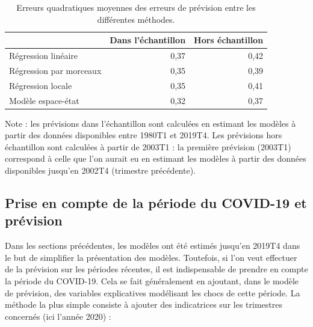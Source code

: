 \documentclass[
  a4paper,
  DIV=11,
  numbers=noendperiod,
  french]{scrartcl}
\newcommand\1{{\mathds 1}}
\theoremstyle{remark}
\begin{document}
\begin{longtable}[]{@{}lrr@{}}

\caption{\label{tbl-res-model-pib}Erreurs quadratiques moyennes des
erreurs de prévision entre les différentes méthodes.}

\tabularnewline

\toprule\noalign{}
& Dans l'échantillon & Hors échantillon \\
\midrule\noalign{}
\endhead
\bottomrule\noalign{}
\endlastfoot
Régression linéaire & 0,37 & 0,42 \\
Régression par morceaux & 0,35 & 0,39 \\
Régression locale & 0,35 & 0,41 \\
Modèle espace-état & 0,32 & 0,37 \\

\end{longtable}

Note : les prévisions dans l'échantillon sont calculées en estimant les
modèles à partir des données disponibles entre 1980T1 et 2019T4. Les
prévisions hors échantillon sont calculées à partir de 2003T1 : la
première prévision (2003T1) correspond à celle que l'on aurait eu en
estimant les modèles à partir des données disponibles jusqu'en 2002T4
(trimestre précédente).

\subsection{Prise en compte de la période du COVID-19 et
prévision}\label{prise-en-compte-de-la-puxe9riode-du-covid-19-et-pruxe9vision}

Dans les sections précédentes, les modèles ont été estimés jusqu'en
2019T4 dans le but de simplifier la présentation des modèles. Toutefois,
si l'on veut effectuer de la prévision sur les périodes récentes, il est
indispensable de prendre en compte la période du COVID-19. Cela se fait
généralement en ajoutant, dans le modèle de prévision, des variables
explicatives modélisant les chocs de cette période. La méthode la plus
simple consiste à ajouter des indicatrices sur les trimestres concernés
(ici l'année 2020) :
\end{document}
